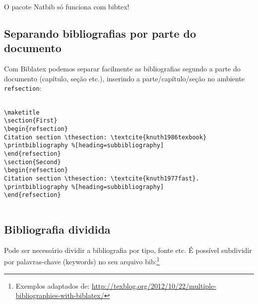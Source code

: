 \begin{center}
\begin{minipage}{.5\textwidth}
\begin{mdframed}[backgroundcolor=lightgray,frametitle=Atenção!,frametitlefont=\bfseries\sffamily,frametitlealignment=\center]
\centering O pacote \textsf{Natbib} só funciona com \textsf{bibtex}!
\end{mdframed}
\end{minipage}
\end{center}


\subsection{Separando bibliografias por parte do documento}

Com \textsf{Biblatex} podemos separar facilmente as bibliografias segundo a parte do documento (capítulo, seção etc.), inserindo a parte/capítulo/seção no ambiente \verb+refsection+:


\begin{verbatim}

\maketitle
\section{First}
\begin{refsection}
Citation section \thesection: \textcite{knuth1986texbook}
\printbibliography %[heading=subbibliography]
\end{refsection}
\section{Second}
\begin{refsection}
Citation section \thesection: \textcite{knuth1977fast}.
\printbibliography %[heading=subbibliography]
\end{refsection}


\end{verbatim}

\subsection{Bibliografia dividida}

Pode ser necessário dividir a bibliografia por tipo, fonte etc. É possível subdividir por palavras-chave (keywords) no seu arquivo bib:\footnote{Exemplos adaptados de: \url{http://texblog.org/2012/10/22/multiple-bibliographies-with-biblatex/}}


